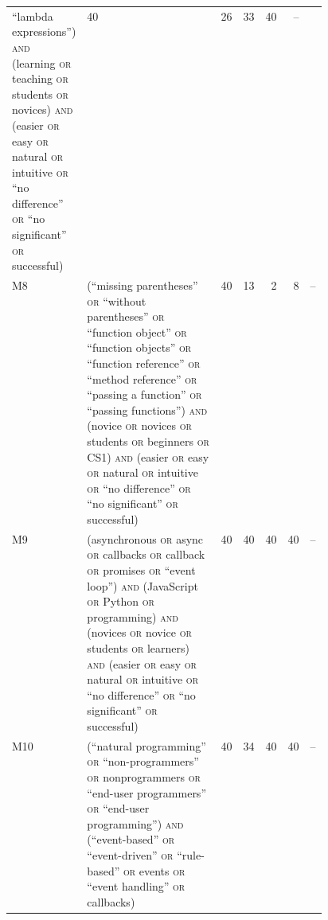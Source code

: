 \begin{table}[htbp]
\begin{tabular}{@{}lp{0.46\linewidth}rrrrr@{}}
       \enquote{lambda expressions}) \textsc{and} (learning \textsc{or}
       teaching \textsc{or} students \textsc{or} novices) \textsc{and}
       (easier \textsc{or} easy \textsc{or} natural \textsc{or} intuitive
       \textsc{or} \enquote{no difference} \textsc{or} \enquote{no
       significant} \textsc{or} successful)
       & 40 & 26 & 33 & 40 & -- \\
    M8 & (\enquote{missing parentheses} \textsc{or} \enquote{without
       parentheses} \textsc{or} \enquote{function object} \textsc{or}
       \enquote{function objects} \textsc{or} \enquote{function
       reference} \textsc{or} \enquote{method reference} \textsc{or}
       \enquote{passing a function} \textsc{or} \enquote{passing
       functions}) \textsc{and} (novice \textsc{or} novices \textsc{or}
       students \textsc{or} beginners \textsc{or} CS1) \textsc{and}
       (easier \textsc{or} easy \textsc{or} natural \textsc{or} intuitive
       \textsc{or} \enquote{no difference} \textsc{or} \enquote{no
       significant} \textsc{or} successful)
       & 40 & 13 & 2 & 8 & -- \\
    M9 & (asynchronous \textsc{or} async \textsc{or} callbacks \textsc{or}
       callback \textsc{or} promises \textsc{or} \enquote{event loop})
       \textsc{and} (JavaScript \textsc{or} Python \textsc{or}
       programming) \textsc{and} (novices \textsc{or} novice \textsc{or}
       students \textsc{or} learners) \textsc{and} (easier \textsc{or}
       easy \textsc{or} natural \textsc{or} intuitive \textsc{or}
       \enquote{no difference} \textsc{or} \enquote{no significant}
       \textsc{or} successful)
       & 40 & 40 & 40 & 40 & -- \\
    M10 & (\enquote{natural programming} \textsc{or}
       \enquote{non-programmers} \textsc{or} nonprogrammers \textsc{or}
       \enquote{end-user programmers} \textsc{or} \enquote{end-user
       programming}) \textsc{and} (\enquote{event-based} \textsc{or}
       \enquote{event-driven} \textsc{or} \enquote{rule-based} \textsc{or}
       events \textsc{or} \enquote{event handling} \textsc{or} callbacks)
       & 40 & 34 & 40 & 40 & -- \\
    \bottomrule
  \end{tabular}
\end{table}

